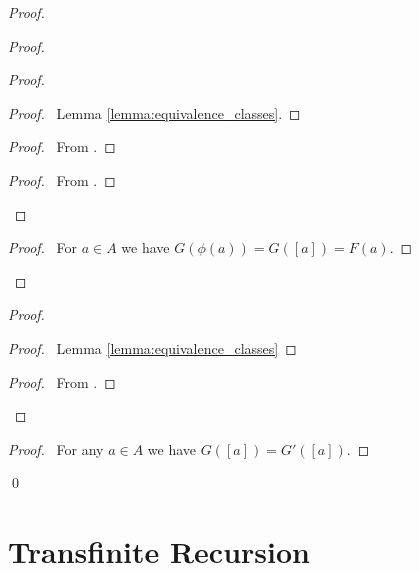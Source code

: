 \begin{proof}
    \pf
    \begin{proof}
        \begin{proof}
            \begin{proof}
                \pf\ Lemma \ref{lemma:equivalence_classes}.
            \end{proof}
            \begin{proof}
                \pf\ From .
            \end{proof}
            \begin{proof}
                \pf\ From .
            \end{proof}
        \end{proof}
        \begin{proof}
            \pf\ For $a \in A$ we have $G(\phi(a)) = G([a]) = F(a)$.
        \end{proof}
    \end{proof}
    \begin{proof}
        \begin{proof}
            \pf\ Lemma \ref{lemma:equivalence_classes}
        \end{proof}
        \begin{proof}
            \pf\ From .
        \end{proof}
    \end{proof}
    \begin{proof}
        \pf\ For any $a \in A$ we have $G([a]) = G'([a])$.
    \end{proof}
    \qed
\end{proof}

\section{Transfinite Recursion}

